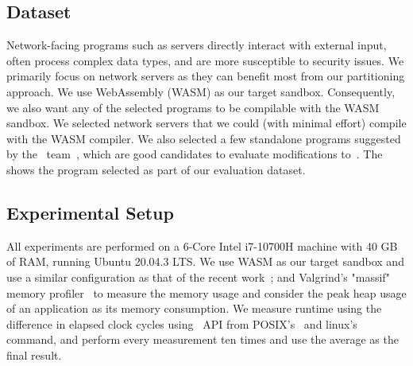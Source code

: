 \subsection{Dataset}
Network-facing programs such as servers directly interact with external input, often process complex data types, and are more susceptible to security issues.
We primarily focus on network servers as they can benefit most from our partitioning approach.
We use WebAssembly (WASM) as our target sandbox. Consequently, we also want any of the selected programs to be compilable with the WASM sandbox.
We selected network servers that we could (with minimal effort) compile with the WASM compiler.
We also selected a few standalone programs suggested by the ~\checkedc team~\cite{benchmarkcc}, which are good candidates to evaluate modifications to~\checkedc.
The~ shows the program selected as part of our evaluation dataset. 


\subsection{Experimental Setup}
\label{experimentalsetup}
All experiments are performed on a 6-Core Intel i7-10700H machine with 40 GB of RAM, running Ubuntu 20.04.3 LTS.
We use WASM as our target sandbox and use a similar configuration as that of the recent work~\cite{rlbox-paper};
and Valgrind's "massif" memory profiler~\cite{seward2008valgrind} to measure the memory usage and consider the peak heap usage of an application as its memory consumption.
We measure runtime using the difference in elapsed clock cycles using~ API from POSIX's~ and linux's ~ command, and perform every measurement ten times and use the average as the final result.

